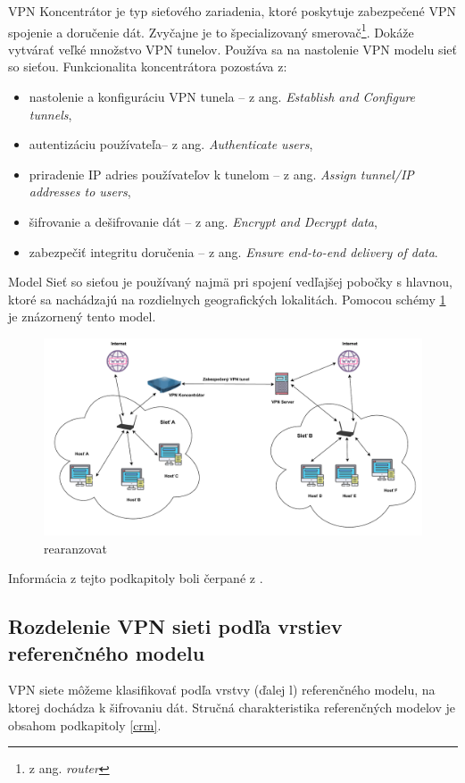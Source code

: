 VPN Koncentrátor je typ sieťového zariadenia, ktoré poskytuje zabezpečené VPN spojenie a doručenie dát. Zvyčajne je to špecializovaný smerovač\footnote{z ang. \textit{router}}. Dokáže vytvárať veľké množstvo VPN tunelov. Používa sa na nastolenie VPN modelu sieť so sieťou. Funkcionalita koncentrátora pozostáva z: 
\begin{itemize}
	\item{nastolenie a konfiguráciu VPN tunela} -- z ang. \textit{Establish and Configure tunnels},
	\item{autentizáciu používateľa}-- z ang. \textit{Authenticate users},
	\item{priradenie IP adries používateľov k tunelom} -- z ang. \textit{Assign tunnel/IP addresses to users},
	\item{šifrovanie a dešifrovanie dát} -- z ang. \textit{Encrypt and Decrypt data},
	\item{zabezpečiť integritu doručenia} -- z ang. \textit{Ensure end-to-end delivery of data}.
\end{itemize}

Model Sieť so sieťou je používaný najmä pri spojení vedľajšej pobočky s hlavnou, ktoré sa nachádzajú na rozdielnych geografických lokalitách. Pomocou schémy \ref{sts} je znázornený tento model. 

 \begin{figure}[!ht]
 	\centering
 	\includegraphics[width=.7\textwidth]{figures/sts}
 	\caption{rearanzovat}
 	\label{sts}
 \end{figure}  

Informácia z tejto podkapitoly boli čerpané z \cite{vpntech}.  
\subsection{Rozdelenie VPN sieti podľa vrstiev referenčného modelu}\label{rm}
VPN siete môžeme klasifikovať podľa vrstvy (ďalej \acrshort{l}) referenčného modelu, na ktorej dochádza k šifrovaniu dát. Stručná charakteristika referenčných modelov je obsahom podkapitoly \ref{crm}.

